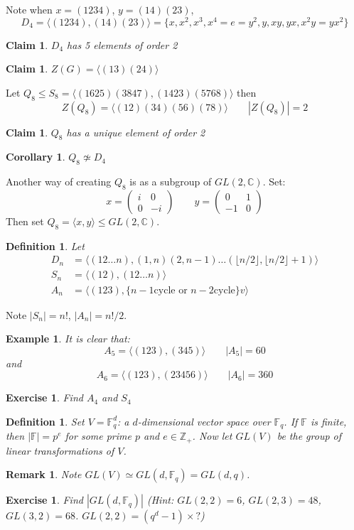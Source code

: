 \documentclass[a4paper,10pt]{article}
\newcommand{\CC}{\mathbb{C}}
\newcommand{\ZZ}{\mathbb{Z}}
\newcommand{\FF}{\mathbb{F}}
\newtheorem{Def}[thm]{Definition}
\newtheorem{Cor}[thm]{Corollary}
\newtheorem{cl}[thm]{Claim}
\newtheorem{eg}[thm]{Example}
\newtheorem{Ex}[thm]{Exercise}
\newtheorem{rem}[thm]{Remark}
\begin{document}
Note when $x = (1234)$, $y = (14)(23)$,
\[ D_4 = \langle (1234), (14)(23)\rangle = \{ x, x^2, x^3, x^4 = e = y^2, y, xy, yx, x^2y = yx^2 \} \]
\begin{cl}
$D_4$ has 5 elements of order 2
\end{cl}
\begin{cl}
$Z(G) = \langle (13)(24) \rangle$
\end{cl}
Let $Q_8 \leq S_8 = \langle (1625)(3847),(1423)(5768)\rangle$ then
\[ Z(Q_8) = \langle (12)(34)(56)(78)\rangle \qquad |Z(Q_8)| = 2 \]
\begin{cl}
$Q_8$ has a unique element of order 2
\end{cl}
\begin{Cor}
$Q_8 \not\simeq D_4$
\end{Cor}
Another way of creating $Q_8$ is as a subgroup of $GL(2,\CC)$. Set:
\[ x = \begin{pmatrix}
 i & 0 \\ 0 & -i
 \end{pmatrix} \qquad y = \begin{pmatrix}
 0 & 1 \\ -1 & 0
 \end{pmatrix} \]
Then set $Q_8 = \langle x,y\rangle \leq GL(2,\CC)$.
\begin{Def}
Let
\begin{align*}
D_n &= \langle (12\dots n),(1,n)(2,n-1)\dots(\lfloor n / 2 \rfloor, \lfloor n / 2 \rfloor +1) \rangle \\
S_n  &= \langle (12),(12\dots n) \rangle \\
A_n &= \langle (123), \{ n-1 \text{cycle or } n-2 \text{cycle} \}v \rangle
\end{align*}
\end{Def}
Note $|S_n| = n!$, $|A_n| = n! / 2$.
\begin{eg}
It is clear that:
\[A_5= \langle (123),(345) \rangle \qquad |A_5| = 60 \]
and 
\[A_6 = \langle (123), (23456) \rangle \qquad |A_6| = 360 \]
\end{eg}
\begin{Ex}
Find $A_4$ and $S_4$
\end{Ex}
\begin{Def}
Set $V = \FF_q^d$: a $d$-dimensional vector space over $\FF_q$. If $\FF$ is finite, then $|\FF| = p^e$ for some prime $p$ and $e \in \ZZ_+$. Now let $GL(V)$ be the group of linear transformations of $V$. 
\end{Def}
\begin{rem}
Note $GL(V) \simeq GL(d, \FF_q) = GL(d, q)$.
\end{rem}
\begin{Ex}
Find $|GL(d,\FF_q)|$ (\textit{Hint: $GL(2,2) = 6$, $GL(2,3) = 48$, $GL(3,2) = 68$. $GL(2,2) = (q^d - 1) \times ?$})
\end{Ex}
\end{document}
